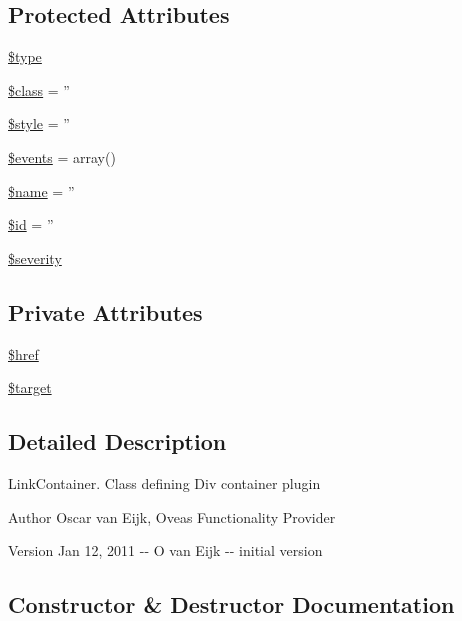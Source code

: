 \subsection*{Protected Attributes}
\begin{DoxyCompactItemize}
\item 
\hyperlink{classContainerPlugin_a4322b57179b2fb28ab6c9587e393842f}{\$type}
\item 
\hyperlink{classBaseElement_a99976a8e967db92e7800309f359b0803}{\$class} = ''
\item 
\hyperlink{classBaseElement_a429a3d642dd95f30e1059ef29564b87d}{\$style} = ''
\item 
\hyperlink{classBaseElement_a02cebe45d277b4ff8f29db08bad371ba}{\$events} = array()
\item 
\hyperlink{classBaseElement_a30b8cff187a9de659a70daf287d66f45}{\$name} = ''
\item 
\hyperlink{classBaseElement_a11b6989c43b53869a09f5ce65aa55b45}{\$id} = ''
\item 
\hyperlink{class__OWL_ad26b40a9dbbacb33e299b17826f8327c}{\$severity}
\end{DoxyCompactItemize}
\subsection*{Private Attributes}
\begin{DoxyCompactItemize}
\item 
\hyperlink{classContainerLinkPlugin_acd3a1db2da03b78ea0b1d035eb771a68}{\$href}
\item 
\hyperlink{classContainerLinkPlugin_acb0deabfd2fdcc6cdc076ff7cca8a7f5}{\$target}
\end{DoxyCompactItemize}


\subsection{Detailed Description}
LinkContainer. Class defining Div container plugin \begin{DoxyAuthor}{Author}
Oscar van Eijk, Oveas Functionality Provider 
\end{DoxyAuthor}
\begin{DoxyVersion}{Version}
Jan 12, 2011 -\/-\/ O van Eijk -\/-\/ initial version 
\end{DoxyVersion}


\subsection{Constructor \& Destructor Documentation}
